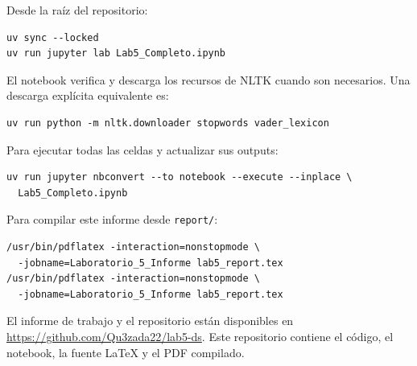 \documentclass[11pt,letterpaper]{article}
\newcommand{\code}[1]{\texttt{#1}}
\begin{document}
Desde la raíz del repositorio:
\begin{verbatim}
uv sync --locked
uv run jupyter lab Lab5_Completo.ipynb
\end{verbatim}

El notebook verifica y descarga los recursos de NLTK cuando son necesarios. Una descarga explícita equivalente es:
\begin{verbatim}
uv run python -m nltk.downloader stopwords vader_lexicon
\end{verbatim}

Para ejecutar todas las celdas y actualizar sus outputs:
\begin{verbatim}
uv run jupyter nbconvert --to notebook --execute --inplace \
  Lab5_Completo.ipynb
\end{verbatim}

Para compilar este informe desde \code{report/}:
\begin{verbatim}
/usr/bin/pdflatex -interaction=nonstopmode \
  -jobname=Laboratorio_5_Informe lab5_report.tex
/usr/bin/pdflatex -interaction=nonstopmode \
  -jobname=Laboratorio_5_Informe lab5_report.tex
\end{verbatim}

El informe de trabajo y el repositorio están disponibles en \url{https://github.com/Qu3zada22/lab5-ds}. Este repositorio contiene el código, el notebook, la fuente LaTeX y el PDF compilado.
\end{document}
